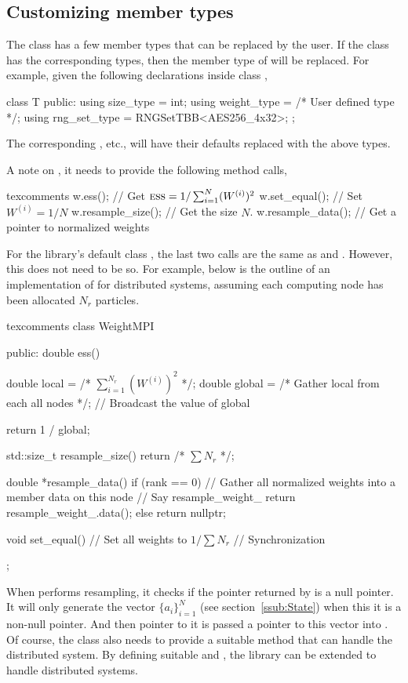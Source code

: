 \subsection{Customizing member types}
\label{sub:Customizing member types}

The  class has a few member types that can be replaced
by the user. If the class  has the corresponding types, then the
member type of  will be replaced. For example, given the
following declarations inside class ,
\begin{cppcode}
  class T
  {
    public:
    using size_type = int;
    using weight_type = /* User defined type */;
    using rng_set_type = RNGSetTBB<AES256_4x32>;
  };
\end{cppcode}
The corresponding , etc., will have their
defaults replaced with the above types.

A note on , it needs to provide the following method
calls,
\begin{cppcode*}{texcomments}
  w.ess();       // Get $\text{\normalfont\textsc{ess}} = 1/\sum_{i=1}^N(W^{(i)})^2$
  w.set_equal(); // Set $W^{(i)} = 1/N$
  w.resample_size(); // Get the size $N$.
  w.resample_data(); // Get a pointer to normalized weights
\end{cppcode*}
For the library's default class , the last two calls are the
same as  and . However, this does not
need to be so. For example, below is the outline of an implementation of
 for distributed systems, assuming each computing node
has been allocated $N_r$ particles.
\begin{cppcode*}{texcomments}
  class WeightMPI
  {
    public:
    double ess()
    {
      double local = /* $\sum_{i=1}^{N_r}(W^{(i)})^2$ */;
      double global = /* Gather local from each all nodes */;
      // Broadcast the value of global

      return 1 / global;
    }

    std::size_t resample_size() { return /* $\sum N_r$ */; }

    double *resample_data()
    {
      if (rank == 0) {
        // Gather all normalized weights into a member data on this node
        // Say resample\_weight\_
        return resample_weight_.data();
      } else {
        return nullptr;
      }
    }

    void set_equal()
    {
      // Set all weights to $1 / \sum N_r$
      // Synchronization
    }
  };
\end{cppcode*}
When  performs resampling, it checks if the pointer
returned by  is a null pointer. It will only
generate the vector $\{a_i\}_{i=1}^N$ (see section~\ref{ssub:State}) when this
it is a non-null pointer. And then pointer to it is passed a pointer to this
vector into . Of course, the class  also needs
to provide a suitable method  that can handle the distributed
system. By defining suitable  and , the
library can be extended to handle distributed systems.

